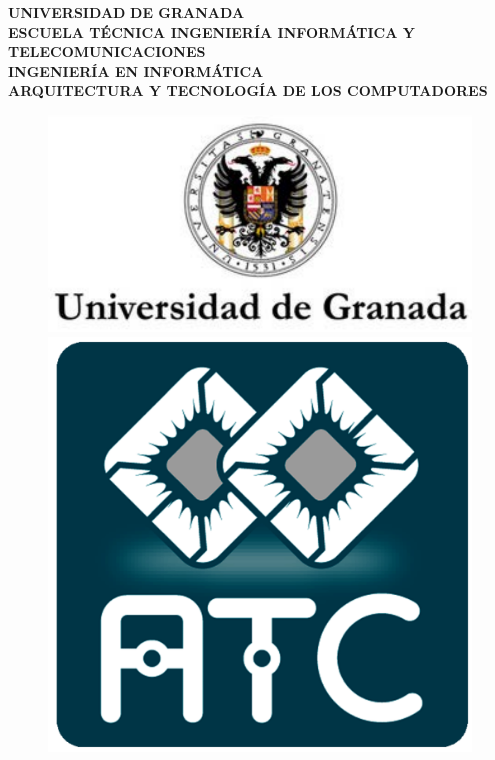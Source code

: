 \begin{titlepage}
\begin{center}
{\large\textbf{UNIVERSIDAD}}
 {\large\textbf{DE GRANADA}}\\
 \vspace{0.8cm}
{\large\textbf {ESCUELA TÉCNICA INGENIERÍA INFORMÁTICA Y TELECOMUNICACIONES}}\\
 \vspace{0.8cm}
{\large\textbf{INGENIERÍA EN INFORMÁTICA}}\\
{\large\textbf {ARQUITECTURA Y TECNOLOGÍA DE LOS COMPUTADORES}}
\end{center}


\begin{figure}[here]
\centering
\includegraphics[scale=0.3]{Portada/fig/escudo_ugr.pdf}
\includegraphics[scale=0.3]{Portada/fig/logo_atc.pdf}
\end{figure}



\end{titlepage}
